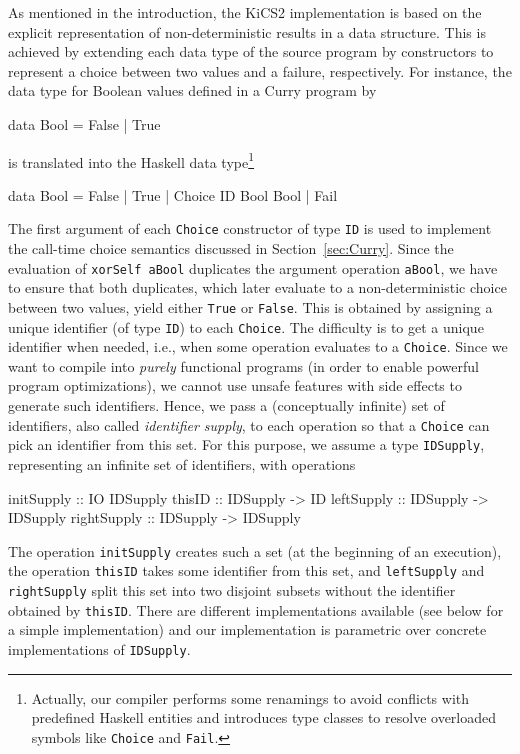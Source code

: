 \documentclass{llncs}
\newcommand{\code}[1]{\mbox{\small\texttt{#1}}}
\begin{document}
As mentioned in the introduction, the KiCS2 implementation
is based on the explicit representation of non-deterministic results
in a data structure.
This is achieved by extending each data type of the source program
by constructors to represent a choice between two values
and a failure, respectively.
For instance, the data type for Boolean values defined in a Curry program by
\begin{curry}
  data Bool = False | True
\end{curry}
is translated into the Haskell data type\footnote{Actually,
our compiler performs some renamings to avoid conflicts with
predefined Haskell entities and introduces type classes
to resolve overloaded symbols like \code{Choice} and \code{Fail}.}
\begin{haskell}
  data Bool = False | True | Choice ID Bool Bool | Fail
\end{haskell}
The first argument of each \code{Choice} constructor of type \code{ID}
is used to implement the call-time choice semantics
discussed in Section~\ref{sec:Curry}.
Since the evaluation of \code{xorSelf aBool} duplicates
the argument operation \code{aBool}, we have to ensure
that both duplicates, which later evaluate to a non-deterministic
choice between two values, yield either \code{True} or \code{False}.
This is obtained by assigning a unique identifier (of type \code{ID})
to each \code{Choice}. The difficulty is to get a unique identifier
when needed, i.e., when some operation evaluates to a \code{Choice}.
Since we want to compile into \emph{purely} functional programs
(in order to enable powerful program optimizations),
we cannot use unsafe features with side effects to generate
such identifiers.
Hence, we pass a (conceptually infinite) set of identifiers,
also called \emph{identifier supply},
to each operation so that a \code{Choice} can pick an identifier from
this set.
For this purpose, we assume a type \code{IDSupply},
representing an infinite set of identifiers,
with operations
\begin{haskell}
  initSupply  :: IO IDSupply
  thisID      :: IDSupply -> ID
  leftSupply  :: IDSupply -> IDSupply
  rightSupply :: IDSupply -> IDSupply
\end{haskell}
The operation \code{initSupply} creates such a set (at the beginning
of an execution),
the operation \code{thisID} takes some identifier from this set, and
\code{leftSupply} and \code{rightSupply} split this set
into two disjoint subsets without the identifier
obtained by \code{thisID}.
There are different implementations available \cite{AugustssonRittriSynek94}
(see below for a simple implementation) and our implementation
is parametric over concrete implementations of \code{IDSupply}.
\end{document}
